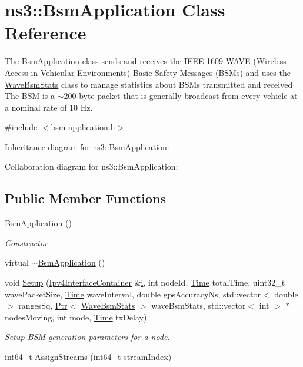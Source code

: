 \hypertarget{classns3_1_1BsmApplication}{}\section{ns3\+:\+:Bsm\+Application Class Reference}
\label{classns3_1_1BsmApplication}


The \hyperlink{classns3_1_1BsmApplication}{Bsm\+Application} class sends and receives the I\+E\+EE 1609 W\+A\+VE (Wireless Access in Vehicular Environments) Basic Safety Messages (B\+S\+Ms) and uses the \hyperlink{classns3_1_1WaveBsmStats}{Wave\+Bsm\+Stats} class to manage statistics about B\+S\+Ms transmitted and received The B\+SM is a $\sim$200-\/byte packet that is generally broadcast from every vehicle at a nominal rate of 10 Hz.  




{\ttfamily \#include $<$bsm-\/application.\+h$>$}



Inheritance diagram for ns3\+:\+:Bsm\+Application\+:


Collaboration diagram for ns3\+:\+:Bsm\+Application\+:
\subsection*{Public Member Functions}
\begin{DoxyCompactItemize}
\item 
\hyperlink{classns3_1_1BsmApplication_abeda43427b8d9eb81af7e489a203adb4}{Bsm\+Application} ()
\begin{DoxyCompactList}\small\item\em Constructor. \end{DoxyCompactList}\item 
virtual \hyperlink{classns3_1_1BsmApplication_ac7038861350100b4b07b8fe0a1b1166f}{$\sim$\+Bsm\+Application} ()
\item 
void \hyperlink{classns3_1_1BsmApplication_a9de57dd437287d1d76007cb7d496981f}{Setup} (\hyperlink{classns3_1_1Ipv4InterfaceContainer}{Ipv4\+Interface\+Container} \&\hyperlink{lte__uplink__power__control_8m_a6f6ccfcf58b31cb6412107d9d5281426}{i}, int node\+Id, \hyperlink{classns3_1_1Time}{Time} total\+Time, uint32\+\_\+t wave\+Packet\+Size, \hyperlink{classns3_1_1Time}{Time} wave\+Interval, double gps\+Accuracy\+Ns, std\+::vector$<$ double $>$ ranges\+Sq, \hyperlink{classns3_1_1Ptr}{Ptr}$<$ \hyperlink{classns3_1_1WaveBsmStats}{Wave\+Bsm\+Stats} $>$ wave\+Bsm\+Stats, std\+::vector$<$ int $>$ $\ast$nodes\+Moving, int mode, \hyperlink{classns3_1_1Time}{Time} tx\+Delay)
\begin{DoxyCompactList}\small\item\em Setup B\+SM generation parameters for a node. \end{DoxyCompactList}\item 
int64\+\_\+t \hyperlink{classns3_1_1BsmApplication_a1c30b47f101a56a5eca9bd77134f08e9}{Assign\+Streams} (int64\+\_\+t stream\+Index)
\end{DoxyCompactItemize}
